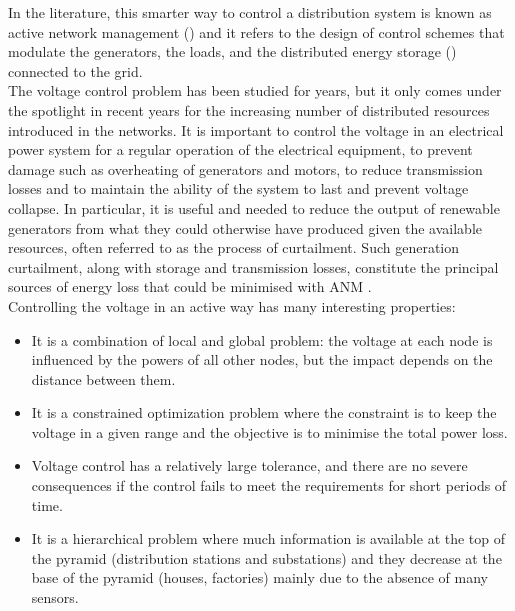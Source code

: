 In the literature, this smarter way to control a distribution system is known as active network management () and it refers to the design of control schemes that modulate the generators, the loads, and the distributed energy storage () connected to the grid. \\

The voltage control problem has been studied for years, but it only comes under the spotlight in recent years for the increasing number of distributed resources introduced in the networks. It is important to control the voltage in an electrical power system for a regular operation of the electrical equipment, to prevent damage such as overheating of generators and motors, to reduce transmission losses and to maintain the ability of the system to last and prevent voltage collapse.
In particular, it is useful and needed to reduce the output of renewable generators from what they could otherwise have produced given the available resources, often referred to as the process of curtailment. Such generation curtailment, along with storage and transmission losses, constitute the principal sources of energy loss that could be minimised with \gls{ANM} \cite{gym-anm}. \\

\noindent Controlling the voltage in an active way has many interesting properties:
\begin{itemize}
    \item It is a combination of local and global problem: the voltage at each node is influenced by the powers of all other nodes, but the impact depends on the distance between them.
    \item It is a constrained optimization problem where the constraint is to keep the voltage in a given range and the objective is to minimise the total power loss.
    \item Voltage control has a relatively large tolerance, and there are no severe consequences if the control fails to meet the requirements for short periods of time. \cite{wang2022multiagent}
    \item It is a hierarchical problem where much information is available at the top of the pyramid (distribution stations and substations) and they decrease at the base of the pyramid (houses, factories) mainly due to the absence of many sensors.
\end{itemize}




